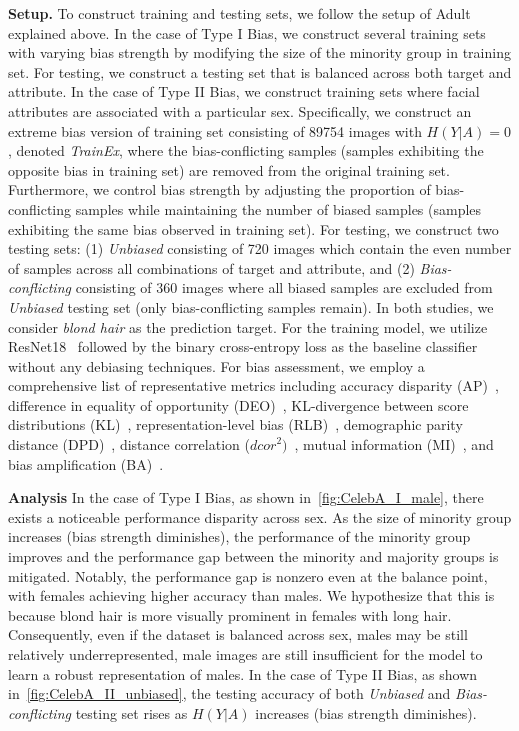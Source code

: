 \noindent
\textbf{Setup.}
To construct training and testing sets, we follow the setup of Adult explained above.
In the case of Type I Bias, we construct several training sets with varying bias strength by modifying the size of the minority group in training set.
For testing, we construct a testing set that is balanced across both target and attribute.
In the case of Type II Bias, we construct training sets where facial attributes are associated with a particular sex.
Specifically, we construct an extreme bias version of training set consisting of 89754 images with $H(Y|A)=0$, denoted \textit{TrainEx}, where the bias-conflicting samples (samples exhibiting the opposite bias in training set) are removed from the original training set.
Furthermore, we control bias strength by adjusting the proportion of bias-conflicting samples while maintaining the number of biased samples (samples exhibiting the same bias observed in training set).
For testing, we construct two testing sets: (1) \emph{Unbiased} consisting of 720 images which contain the even number of samples across all combinations of target and attribute, and (2) \emph{Bias-conflicting} consisting of 360 images where all biased samples are excluded from \emph{Unbiased} testing set (only bias-conflicting samples remain).
In both studies, we consider \emph{blond hair} as the prediction target.
For the training model, we utilize ResNet18~\cite{ResNet} followed by the binary cross-entropy loss as the baseline classifier without any debiasing techniques. 
For bias assessment, we employ a comprehensive list of representative metrics including accuracy disparity (AP)~\cite{Accuracy_parity}, difference in equality of opportunity (DEO)~\cite{SensitiveNets}, KL-divergence between score distributions (KL)~\cite{divergence_between_score_distributions}, representation-level bias (RLB)~\cite{RLB}, demographic parity distance (DPD)~\cite{DP_FFVAE}, distance correlation (${dcor}^2)$~\cite{distance_correlation}, mutual information (MI)~\cite{CAT}, and bias amplification (BA)~\cite{BA,Directional_BA}.






\noindent
\textbf{Analysis}
In the case of Type I Bias, as shown in~\cref{fig:CelebA_I_male}, there exists a noticeable performance disparity across sex. 
As the size of minority group increases (bias strength diminishes), the performance of the minority group improves and the performance gap between the minority and majority groups is mitigated.
Notably, the performance gap is nonzero even at the balance point, with females achieving higher accuracy than males. 
We hypothesize that this is because blond hair is more visually prominent in females with long hair.
Consequently, even if the dataset is balanced across sex, males may be still relatively underrepresented, \ie male images are still insufficient for the model to learn a robust representation of males.
In the case of Type II Bias, as shown in~\cref{fig:CelebA_II_unbiased}, the testing accuracy of both \emph{Unbiased} and \emph{Bias-conflicting} testing set rises as $H(Y|A)$ increases (bias strength diminishes).



